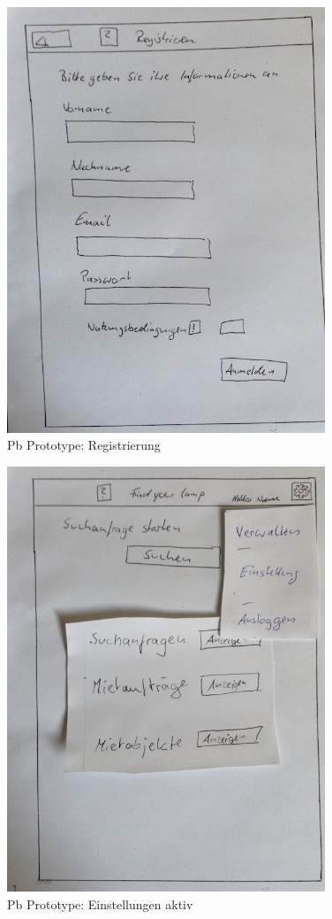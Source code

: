 \begin{figure}[H]
\centering
\includegraphics[angle=90, width=0.85\textwidth]{./images/paperbased/registrieren.JPG}
\caption{Pb Prototype: Registrierung}
\label{pbprototype11}
\end{figure}

\begin{figure}[H]
\centering
\includegraphics[angle=90, width=0.85\textwidth]{./images/paperbased/settings.JPG}
\caption{Pb Prototype: Einstellungen aktiv}
\label{pbprototype12}
\end{figure}

